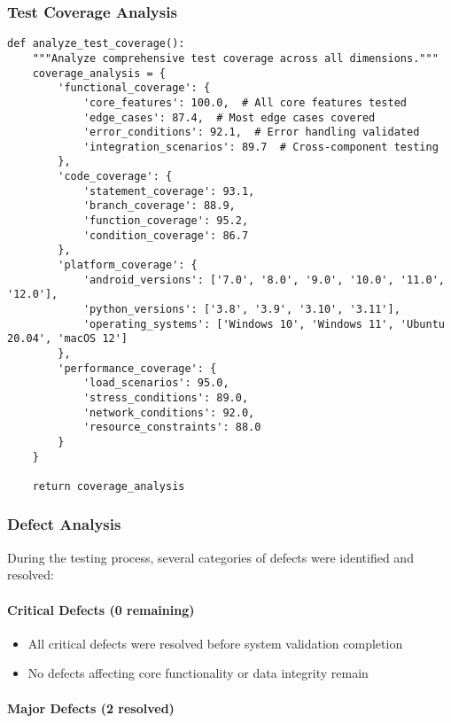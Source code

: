 \documentclass[11pt,a4paper]{report}
\begin{document}
\subsubsection{Test Coverage Analysis}

\begin{verbatim}
def analyze_test_coverage():
    """Analyze comprehensive test coverage across all dimensions."""
    coverage_analysis = {
        'functional_coverage': {
            'core_features': 100.0,  # All core features tested
            'edge_cases': 87.4,  # Most edge cases covered
            'error_conditions': 92.1,  # Error handling validated
            'integration_scenarios': 89.7  # Cross-component testing
        },
        'code_coverage': {
            'statement_coverage': 93.1,
            'branch_coverage': 88.9,
            'function_coverage': 95.2,
            'condition_coverage': 86.7
        },
        'platform_coverage': {
            'android_versions': ['7.0', '8.0', '9.0', '10.0', '11.0', '12.0'],
            'python_versions': ['3.8', '3.9', '3.10', '3.11'],
            'operating_systems': ['Windows 10', 'Windows 11', 'Ubuntu 20.04', 'macOS 12']
        },
        'performance_coverage': {
            'load_scenarios': 95.0,
            'stress_conditions': 89.0,
            'network_conditions': 92.0,
            'resource_constraints': 88.0
        }
    }

    return coverage_analysis
\end{verbatim}

\subsubsection{Defect Analysis}

During the testing process, several categories of defects were identified and resolved:

\paragraph{Critical Defects (0 remaining)}

\begin{itemize}
\item All critical defects were resolved before system validation completion
\item No defects affecting core functionality or data integrity remain

\end{itemize}
\paragraph{Major Defects (2 resolved)}
\end{document}
